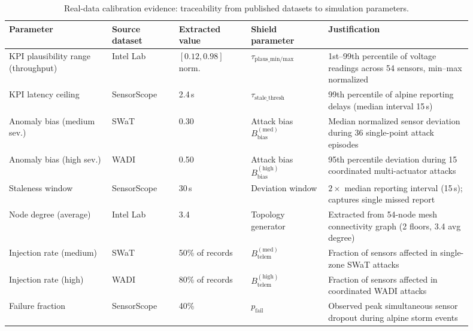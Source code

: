 \documentclass[10pt,journal,compsoc]{IEEEtran}
\begin{document}
\begin{table}[t]
\centering
\caption{Real-data calibration evidence: traceability from published datasets to simulation parameters.}
\label{tab:calibration_evidence}
\begin{tabular}{p{0.20\linewidth}p{0.13\linewidth}p{0.14\linewidth}p{0.15\linewidth}p{0.28\linewidth}}
\toprule
Parameter & Source dataset & Extracted value & Shield parameter & Justification \\
\midrule
KPI plausibility range (throughput) & Intel Lab~\cite{intel_lab_data_2004} & $[0.12, 0.98]$ norm. & $\tau_{\mathrm{plaus\_min/max}}$ & 1st--99th percentile of voltage readings across 54 sensors, min--max normalized \\
KPI latency ceiling & SensorScope~\cite{sensorscope2008} & 2.4\,s & $\tau_{\mathrm{stale\_thresh}}$ & 99th percentile of alpine reporting delays (median interval 15\,s) \\
Anomaly bias (medium sev.) & SWaT~\cite{goh2017swat} & 0.30 & Attack bias $B_{\mathrm{bias}}^{(\mathrm{med})}$ & Median normalized sensor deviation during 36 single-point attack episodes \\
Anomaly bias (high sev.) & WADI~\cite{wadi2018} & 0.50 & Attack bias $B_{\mathrm{bias}}^{(\mathrm{high})}$ & 95th percentile deviation during 15 coordinated multi-actuator attacks \\
Staleness window & SensorScope~\cite{sensorscope2008} & 30\,s & Deviation window & $2\times$ median reporting interval (15\,s); captures single missed report \\
Node degree (average) & Intel Lab~\cite{intel_lab_data_2004} & 3.4 & Topology generator & Extracted from 54-node mesh connectivity graph (2 floors, 3.4 avg degree) \\
Injection rate (medium) & SWaT~\cite{goh2017swat} & 50\% of records & $B_{\mathrm{telem}}^{(\mathrm{med})}$ & Fraction of sensors affected in single-zone SWaT attacks \\
Injection rate (high) & WADI~\cite{wadi2018} & 80\% of records & $B_{\mathrm{telem}}^{(\mathrm{high})}$ & Fraction of sensors affected in coordinated WADI attacks \\
Failure fraction & SensorScope~\cite{sensorscope2008} & 40\% & $p_{\mathrm{fail}}$ & Observed peak simultaneous sensor dropout during alpine storm events \\
\bottomrule
\end{tabular}
\end{table}
\end{document}
